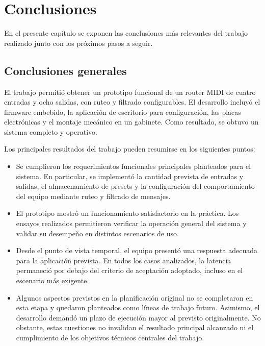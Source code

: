 
\chapter{Conclusiones} %

\label{Chapter5}
En el presente capítulo se exponen las conclusiones más relevantes del trabajo realizado junto con los próximos pasos a seguir.



\section{Conclusiones generales}

El trabajo permitió obtener un prototipo funcional de un router MIDI de cuatro entradas y ocho salidas, con ruteo y filtrado configurables. El desarrollo incluyó el firmware embebido, la aplicación de escritorio para configuración, las placas electrónicas y el montaje mecánico en un gabinete. Como resultado, se obtuvo un sistema completo y operativo.

Los principales resultados del trabajo pueden resumirse en los siguientes puntos:
\begin{itemize}
	\item Se cumplieron los requerimientos funcionales principales planteados para el sistema. En particular, se implementó la cantidad prevista de entradas y salidas, el almacenamiento de presets y la configuración del comportamiento del equipo mediante ruteo y filtrado de mensajes.

	\item El prototipo mostró un funcionamiento satisfactorio en la práctica. Los ensayos realizados permitieron verificar la operación general del sistema y validar su desempeño en distintos escenarios de uso.

	\item Desde el punto de vista temporal, el equipo presentó una respuesta adecuada para la aplicación prevista. En todos los casos analizados, la latencia permaneció por debajo del criterio de aceptación adoptado, incluso en el escenario más exigente.

	\item Algunos aspectos previstos en la planificación original no se completaron en esta etapa y quedaron planteados como líneas de trabajo futuro. Asimismo, el desarrollo demandó un plazo de ejecución mayor al previsto originalmente. No obstante, estas cuestiones no invalidan el resultado principal alcanzado ni el cumplimiento de los objetivos técnicos centrales del trabajo.
\end{itemize}

